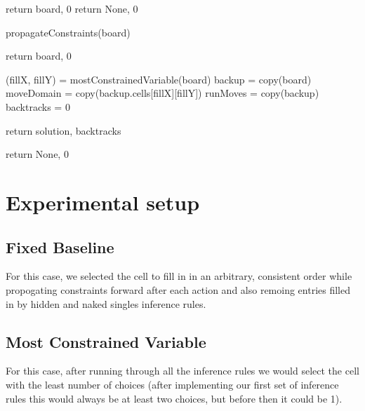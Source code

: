 \documentclass{article}
\begin{document}
  \begin{algorithmic}
    \State return board, 0  
  \EndIf
    \State return None, 0   
  \EndIf
       
  \State propagateConstraints(board)

    \State return board, 0   
  \EndIf
  

  \State (fillX, fillY) = mostConstrainedVariable(board)
  \State backup = copy(board)
  \State moveDomain = copy(backup.cells[fillX][fillY])
  \State runMoves = copy(backup)
  \State backtracks = 0



      \EndIf



      \EndIf



      \State return solution, backtracks
      \EndIf

      \EndFor
  \State return None, 0           
    
         \end{algorithmic}
 \label{alg:Backtracking Search}
 

 
 

\section{Experimental setup}
\subsection{Fixed  Baseline}
For this case, we selected the  cell to fill in in an arbitrary, consistent order while propogating constraints forward after each action and also remoing entries filled in by hidden and naked singles inference rules. 
\subsection{Most Constrained Variable}
For this case, after running through all the inference rules we would select the cell with the least number of choices (after implementing our first set of inference rules this would always be at least two choices, but before then it could be 1). 
\end{document}
